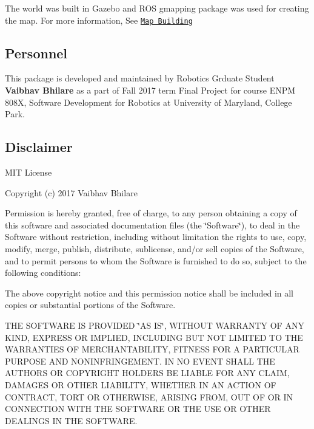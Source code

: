 The world was built in Gazebo and R\+OS gmapping package was used for creating the map. For more information, See \href{http://wiki.ros.org/turtlebot_navigation/Tutorials/Build%20a%20map%20with%20SLAM}{\tt Map Building}

\subsection*{Personnel}

This package is developed and maintained by Robotics Grduate Student {\bfseries Vaibhav Bhilare} as a part of Fall 2017 term Final Project for course E\+N\+PM 808X, Software Development for Robotics at University of Maryland, College Park.

\subsection*{Disclaimer}

M\+IT License

Copyright (c) 2017 Vaibhav Bhilare

Permission is hereby granted, free of charge, to any person obtaining a copy of this software and associated documentation files (the \char`\"{}\+Software\char`\"{}), to deal in the Software without restriction, including without limitation the rights to use, copy, modify, merge, publish, distribute, sublicense, and/or sell copies of the Software, and to permit persons to whom the Software is furnished to do so, subject to the following conditions\+:

The above copyright notice and this permission notice shall be included in all copies or substantial portions of the Software.

T\+HE S\+O\+F\+T\+W\+A\+RE IS P\+R\+O\+V\+I\+D\+ED \char`\"{}\+A\+S I\+S\char`\"{}, W\+I\+T\+H\+O\+UT W\+A\+R\+R\+A\+N\+TY OF A\+NY K\+I\+ND, E\+X\+P\+R\+E\+SS OR I\+M\+P\+L\+I\+ED, I\+N\+C\+L\+U\+D\+I\+NG B\+UT N\+OT L\+I\+M\+I\+T\+ED TO T\+HE W\+A\+R\+R\+A\+N\+T\+I\+ES OF M\+E\+R\+C\+H\+A\+N\+T\+A\+B\+I\+L\+I\+TY, F\+I\+T\+N\+E\+SS F\+OR A P\+A\+R\+T\+I\+C\+U\+L\+AR P\+U\+R\+P\+O\+SE A\+ND N\+O\+N\+I\+N\+F\+R\+I\+N\+G\+E\+M\+E\+NT. IN NO E\+V\+E\+NT S\+H\+A\+LL T\+HE A\+U\+T\+H\+O\+RS OR C\+O\+P\+Y\+R\+I\+G\+HT H\+O\+L\+D\+E\+RS BE L\+I\+A\+B\+LE F\+OR A\+NY C\+L\+A\+IM, D\+A\+M\+A\+G\+ES OR O\+T\+H\+ER L\+I\+A\+B\+I\+L\+I\+TY, W\+H\+E\+T\+H\+ER IN AN A\+C\+T\+I\+ON OF C\+O\+N\+T\+R\+A\+CT, T\+O\+RT OR O\+T\+H\+E\+R\+W\+I\+SE, A\+R\+I\+S\+I\+NG F\+R\+OM, O\+UT OF OR IN C\+O\+N\+N\+E\+C\+T\+I\+ON W\+I\+TH T\+HE S\+O\+F\+T\+W\+A\+RE OR T\+HE U\+SE OR O\+T\+H\+ER D\+E\+A\+L\+I\+N\+GS IN T\+HE S\+O\+F\+T\+W\+A\+RE.

